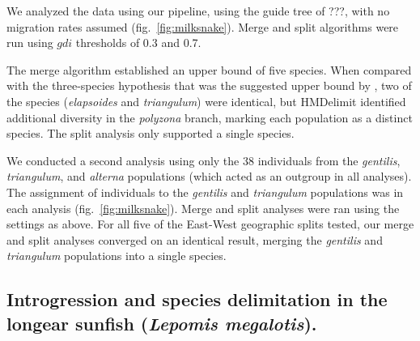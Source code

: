 \documentclass[A4]{article1}
\newcommand{\red}[1]{{\color{red}{#1}}}
\begin{document}
We analyzed the data using our pipeline, using the guide tree of ???, with no migration
rates assumed (fig.~\ref{fig:milksnake}).  Merge and split algorithms were run using $gdi$
thresholds of 0.3 and 0.7.

The merge algorithm established an upper bound of five species.  When compared with the
three-species hypothesis that was the suggested upper bound by \citet{Chambers2020}, two
of the species (\textit{elapsoides} and \textit{triangulum}) were identical, but
HMDelimit identified additional diversity in the \textit{polyzona} branch, marking each
population as a distinct species.  The split analysis only supported a single species.

\red{[I'll probably delete this later.  I seem to remember there were many problems with
    the Chambers\&Hillis paper, but i need to read it to refresh my memory.]} We conducted a
second analysis using only the 38 individuals from the \textit{gentilis},
\textit{triangulum}, and \textit{alterna} populations (which acted as an outgroup in all
analyses).  The assignment of individuals to the \textit{gentilis} and \textit{triangulum}
populations was \red{varied?} in each analysis (fig.~\ref{fig:milksnake}).  Merge and
split analyses were ran using the settings as above.  For all five of the East-West
geographic splits tested, our merge and split analyses converged on an identical result,
merging the \textit{gentilis} and \textit{triangulum} populations into a single species.



\subsection{Introgression and species delimitation in the longear sunfish (\textit{Lepomis
        megalotis}).}
\end{document}
